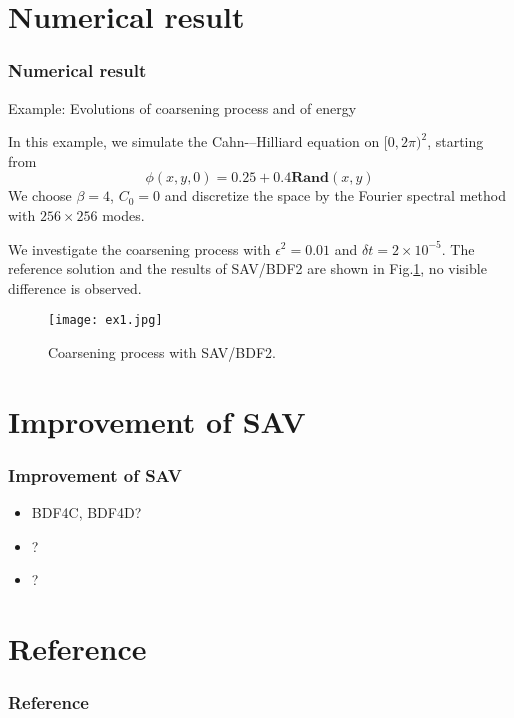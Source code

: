 \documentclass{beamer}
\begin{document}
\section{Numerical result}
    \begin{frame}[allowframebreaks]
    \frametitle{Numerical result}

    Example: Evolutions of coarsening process and of energy
    
    In this example, we simulate the Cahn-–Hilliard equation on $[0,2\pi)^2$, starting from
\begin{equation}
\phi(x,y,0)=0.25+0.4\textbf{Rand}(x,y)
\end{equation}
We choose $\beta=4$, $C_0=0$ and discretize the space by the Fourier spectral method with $256\times 256$ modes.

We investigate the coarsening process with $\epsilon^2=0.01$ and $\delta t=2\times 10^{-5}$. The reference solution and the results of SAV/BDF2 are shown in Fig.\ref{fig:1}, no visible difference is observed.
        
\begin{figure}[htb]%
	\centering  %
	\texttt{[image: ex1.jpg]}  %
	\caption{Coarsening process with SAV/BDF2.}  %
	\label{fig:1}   %
\end{figure}

    \end{frame}
\section{Improvement of SAV}
    \begin{frame}
    \frametitle{Improvement of SAV}

    \begin{itemize}
      \item BDF4C, BDF4D?
      \item ?
      \item ?
    \end{itemize}

    \end{frame}
    
\section{Reference}
    \begin{frame}[allowframebreaks]
\frametitle{Reference}
    \printbibliography

    \end{frame}
\end{document}
